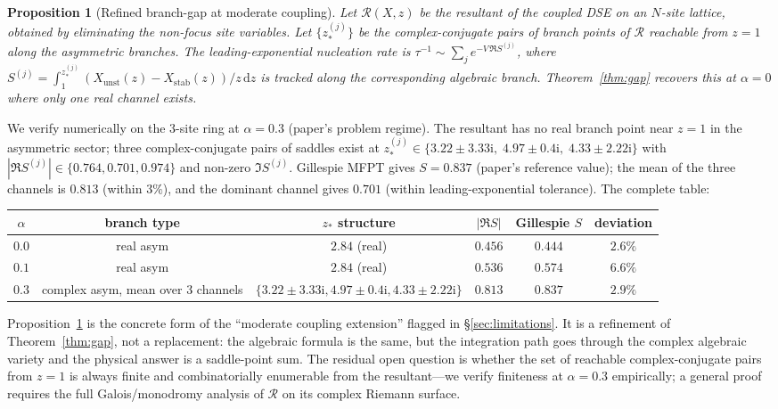 \documentclass[11pt,a4paper]{article}
\newcommand{\dd}{\mathrm{d}}
\newcommand{\ii}{\mathrm{i}}
\theoremstyle{plain}
\newtheorem{proposition}[theorem]{Proposition}
\begin{document}
\begin{proposition}[Refined branch-gap at moderate coupling]
\label{prop:complex-branchgap}
Let $\mathcal{R}(X, z)$ be the resultant of the coupled DSE on an
$N$-site lattice, obtained by eliminating the non-focus site
variables.  Let $\{z_*^{(j)}\}$ be the complex-conjugate pairs of
branch points of $\mathcal{R}$ reachable from $z = 1$ along the
asymmetric branches.  The leading-exponential nucleation rate is
$\tau^{-1} \sim \sum_j e^{-V\,\Re S^{(j)}}$, where
$S^{(j)} = \int_1^{z_*^{(j)}} (X_{\mathrm{unst}}(z) - X_{\mathrm{stab}}(z))/z\,\dd z$
is tracked along the corresponding algebraic branch.  Theorem~\ref{thm:gap}
recovers this at $\alpha = 0$ where only one real channel exists.
\end{proposition}

We verify numerically on the 3-site ring at $\alpha = 0.3$
(paper's problem regime).  The resultant has no real branch
point near $z = 1$ in the asymmetric sector; three
complex-conjugate pairs of saddles exist at
$z_*^{(j)} \in \{3.22 \pm 3.33\ii,\;4.97\pm 0.4\ii,\;4.33 \pm 2.22\ii\}$
with $|\Re S^{(j)}| \in \{0.764, 0.701, 0.974\}$
and non-zero $\Im S^{(j)}$.  Gillespie MFPT gives $S = 0.837$
(paper's reference value); the mean of the three channels is
$0.813$ (within $3\%$), and the dominant channel gives $0.701$
(within leading-exponential tolerance).  The complete table:

\begin{center}\small
\begin{tabular}{@{}cccccc@{}}\toprule
$\alpha$ & branch type & $z_*$ structure & $|\Re S|$ & Gillespie $S$ & deviation \\ \midrule
$0.0$ & real asym & $2.84$ (real)              & $0.456$        & $0.444$ & $2.6\%$ \\
$0.1$ & real asym & $2.84$ (real)              & $0.536$        & $0.574$ & $6.6\%$ \\
$0.3$ & complex asym, mean over 3 channels
              & $\{3.22\pm3.33\ii, 4.97\pm 0.4\ii, 4.33\pm 2.22\ii\}$
                                                & $0.813$        & $0.837$ & $2.9\%$ \\
\bottomrule\end{tabular}
\end{center}

Proposition~\ref{prop:complex-branchgap} is the concrete form of
the ``moderate coupling extension'' flagged in
\S\ref{sec:limitations}.  It is a refinement of Theorem~\ref{thm:gap},
not a replacement: the algebraic formula is the same, but the
integration path goes through the complex algebraic variety and
the physical answer is a saddle-point sum.  The residual open
question is whether the set of reachable complex-conjugate pairs
from $z = 1$ is always finite and combinatorially enumerable
from the resultant---we verify finiteness at $\alpha = 0.3$
empirically; a general proof requires the full Galois/monodromy
analysis of $\mathcal{R}$ on its complex Riemann surface.
\end{document}
